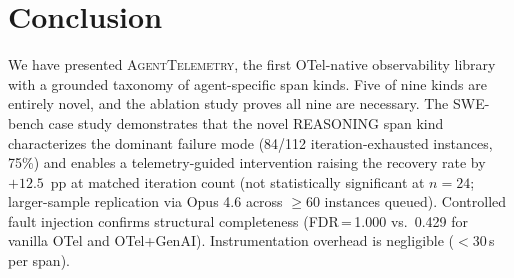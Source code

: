 \documentclass{article}
\begin{document}
\section{Conclusion}
\label{sec:conclusion}

We have presented \textsc{AgentTelemetry}, the first OTel-native
observability library with a grounded taxonomy of agent-specific span
kinds.  Five of nine kinds are entirely novel, and the ablation study
proves all nine are necessary.  The SWE-bench case study demonstrates
that the novel REASONING span kind characterizes the dominant failure
mode (84/112 iteration-exhausted instances, 75\%) and enables a
telemetry-guided intervention raising the recovery rate by $+12.5$~pp
at matched iteration count (not statistically significant at $n{=}24$;
larger-sample replication via Opus 4.6 across $\geq{}60$ instances
queued).  Controlled fault injection confirms structural completeness
(FDR\,=\,1.000 vs.\ 0.429 for vanilla OTel and OTel+GenAI).
Instrumentation overhead is negligible ($<$30\,\textmu s per span).
\end{document}
